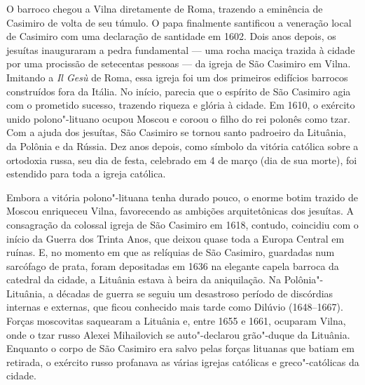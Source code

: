\asterisc

O barroco chegou a Vilna diretamente de Roma, trazendo a eminência de
Casimiro de volta de seu túmulo. O papa finalmente santificou a
veneração local de Casimiro com uma declaração de santidade em 1602.
Dois anos depois, os jesuítas inauguraram a pedra fundamental --- uma
rocha maciça trazida à cidade por uma procissão de setecentas pessoas ---
da igreja de São Casimiro em Vilna. Imitando a \emph{Il Gesù} de Roma,
essa igreja foi um dos primeiros edifícios barrocos construídos fora da
Itália. No início, parecia que o espírito de São Casimiro agia com o
prometido sucesso, trazendo riqueza e glória à cidade. Em 1610, o
exército unido polono"-lituano ocupou Moscou e coroou o filho do rei
polonês como tzar. Com a ajuda dos jesuítas, São Casimiro se tornou
santo padroeiro da Lituânia, da Polônia e da Rússia. Dez anos depois,
como símbolo da vitória católica sobre a ortodoxia russa, seu dia de
festa, celebrado em 4 de março (dia de sua morte), foi estendido para
toda a igreja católica.

Embora a vitória polono"-lituana tenha durado pouco, o enorme botim
trazido de Moscou enriqueceu Vilna, favorecendo as ambições
arquitetônicas dos jesuítas. A consagração da colossal igreja de São
Casimiro em 1618, contudo, coincidiu com o início da Guerra dos Trinta
Anos, que deixou quase toda a Europa Central em ruínas. E, no momento em
que as relíquias de São Casimiro, guardadas num sarcófago de prata,
foram depositadas em 1636 na elegante capela barroca da catedral da
cidade, a Lituânia estava à beira da aniquilação. Na Polônia"-Lituânia, a
décadas de guerra se seguiu um desastroso período de discórdias internas
e externas, que ficou conhecido mais tarde como Dilúvio (1648--1667).
Forças moscovitas saquearam a Lituânia e, entre 1655 e 1661, ocuparam
Vilna, onde o tzar russo Alexei Mihailovich se auto"-declarou grão"-duque
da Lituânia. Enquanto o corpo de São Casimiro era salvo pelas forças
lituanas que batiam em retirada, o exército russo profanava as várias
igrejas católicas e greco"-católicas da cidade.

%

